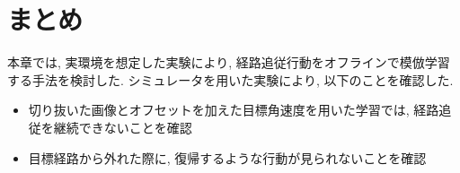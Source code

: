 \section{まとめ}
本章では, 実環境を想定した実験により, 経路追従行動をオフラインで模倣学習する手法を検討した. シミュレータを用いた実験により, 以下のことを確認した. 

\begin{itemize}
  \item 切り抜いた画像とオフセットを加えた目標角速度を用いた学習では, 経路追従を継続できないことを確認
  \item 目標経路から外れた際に, 復帰するような行動が見られないことを確認
\end{itemize}



